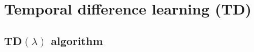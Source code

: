\section{Temporal difference learning (TD)}

\subsection{TD\texorpdfstring{\( (\lambda) \)}{ (lambda) } algorithm}
